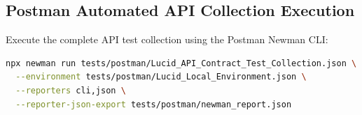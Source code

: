 \subsection{Postman Automated API Collection Execution}
Execute the complete API test collection using the Postman Newman CLI:
\begin{lstlisting}[language=bash]
npx newman run tests/postman/Lucid_API_Contract_Test_Collection.json \
  --environment tests/postman/Lucid_Local_Environment.json \
  --reporters cli,json \
  --reporter-json-export tests/postman/newman_report.json
\end{lstlisting}
